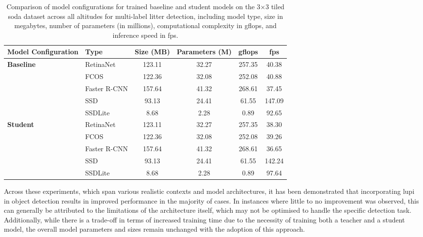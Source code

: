 \begin{table}[!ht]
    \centering
    \begin{adjustbox}{width=\textwidth}
    \begin{tabular}{llcccc}
        \toprule
        \textbf{Model Configuration} & \textbf{Type} & \textbf{Size (MB)} & \textbf{Parameters (M)} & \textbf{\gls{gflops}} & \textbf{\gls{fps}} \\
        \midrule
        \multirow{5}{*}{\textbf{Baseline}} 
            & RetinaNet     & 123.11 & 32.27 & 257.35 & 40.38 \\
            & FCOS          & 122.36 & 32.08 & 252.08 & 40.88 \\
            & Faster R-CNN  & 157.64 & 41.32 & 268.61 & 37.45 \\
            & SSD           & 93.13  & 24.41 & 61.55 & 147.09 \\
            & SSDLite       & 8.68   & 2.28 & 0.89 & 92.65\\
        \midrule
        \multirow{5}{*}{\textbf{Student}} 
            & RetinaNet     & 123.11 & 32.27 & 257.35 & 38.30 \\
            & FCOS          & 122.36 & 32.08 & 252.08 & 39.26 \\
            & Faster R-CNN  & 157.64 & 41.32 & 268.61 & 36.65 \\
            & SSD           & 93.13  & 24.41 & 61.55 & 142.24 \\
            & SSDLite       & 8.68   & 2.28 & 0.89 & 97.64\\
        \bottomrule
    \end{tabular}
    \end{adjustbox}
    \caption{Comparison of model configurations for trained baseline and student models on the 3$\times$3 tiled \gls{soda} dataset across all altitudes for multi-label litter detection, including model type, size in megabytes, number of parameters (in millions), computational complexity in \gls{gflops}, and inference speed in \gls{fps}.}
    \label{tab:model_configs_soda_tiled_multi}
\end{table}

Across these experiments, which span various realistic contexts and model architectures, it has been demonstrated that incorporating \gls{lupi} in object detection results in improved performance in the majority of cases. In instances where little to no improvement was observed, this can generally be attributed to the limitations of the architecture itself, which may not be optimised to handle the specific detection task. Additionally, while there is a trade-off in terms of increased training time due to the necessity of training both a teacher and a student model, the overall model parameters and sizes remain unchanged with the adoption of this approach.

